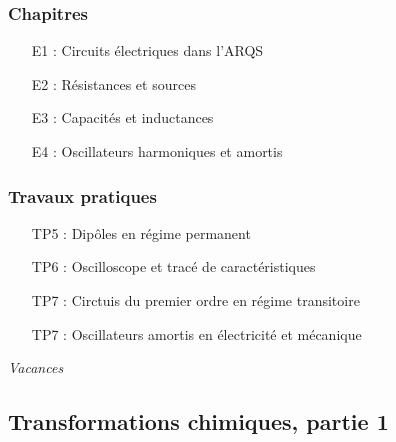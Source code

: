 \documentclass[a4paper, 10pt, final, garamond]{book}
\begin{document}
\begin{multicols}{2}
	\subsubsection{Chapitres}

	\begin{itemize}[label=$\diamond$]
		\item[E1]: Circuits électriques dans l'ARQS
		\item[E2]: Résistances et sources
		\item[E3]: Capacités et inductances
		\item[E4]: Oscillateurs harmoniques et amortis
	\end{itemize}

	\columnbreak

	\subsubsection{Travaux pratiques}

	\begin{itemize}[label=$\diamond$]
		\item[TP5]: Dipôles en régime permanent
		\item[TP6]: Oscilloscope et tracé de caractéristiques
		\item[TP7]: Circtuis du premier ordre en régime transitoire
		\item[TP7]: Oscillateurs amortis en électricité et mécanique
	\end{itemize}
\end{multicols}

\begin{center}
	\textit{\Large Vacances}
\end{center}

\subsection{Transformations chimiques, partie 1}
\end{document}
